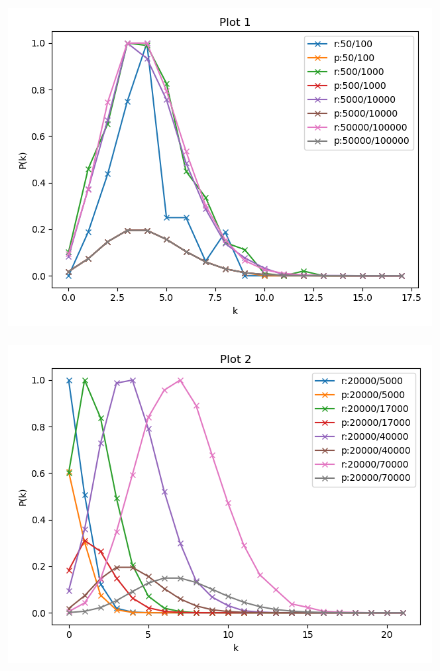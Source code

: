 \documentclass[10pt,a4paper]{article}
\begin{document}
\begin{enumerate}
	
\begin{figure}[H]
	\centering
	\includegraphics[width=0.9\linewidth]{"../Scripts/Plot 1"}
	\caption{}
	\label{fig:plot-1}
\end{figure}


\begin{figure}[H]
	\centering
	\includegraphics[width=0.9\linewidth]{"../Scripts/Plot 2"}
	\caption{}
	\label{fig:plot-2}
\end{figure}






\end{enumerate}
\end{document}
